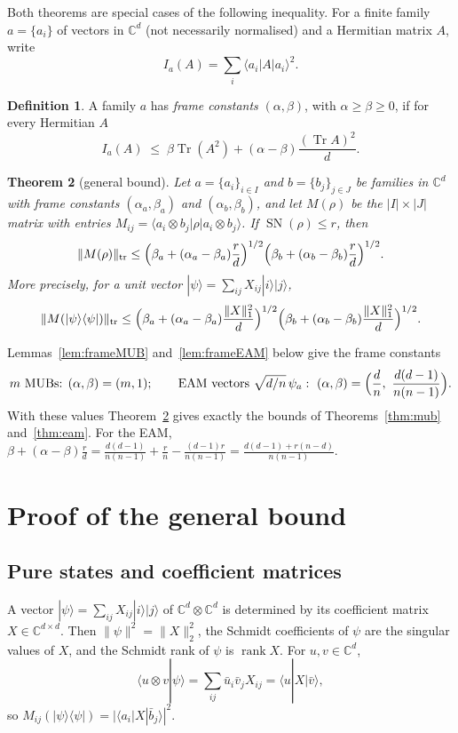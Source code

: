 \documentclass[11pt]{amsart}
\newtheorem{theorem}{Theorem}
\theoremstyle{definition}
\newtheorem{definition}[theorem]{Definition}
\theoremstyle{remark}
\newcommand{\C}{\mathbb{C}}
\newcommand{\Tr}{\operatorname{Tr}}
\newcommand{\SN}{\operatorname{SN}}
\newcommand{\tr}{\mathrm{tr}}
\newcommand{\ket}[1]{|#1\rangle}
\newcommand{\bra}[1]{\langle #1|}
\begin{document}
Both theorems are special cases of the following inequality. For a finite family $a=\{a_i\}$ of vectors in $\C^d$
(not necessarily normalised) and a Hermitian matrix $A$, write
\[
I_a(A)=\sum_i\bra{a_i}A\ket{a_i}^2 .
\]
\begin{definition}\label{def:frame}
A family $a$ has \emph{frame constants} $(\alpha,\beta)$, with $\alpha\ge\beta\ge0$, if for every Hermitian $A$
\begin{equation}\label{eq:frame}
I_a(A)\;\le\;\beta\Tr(A^2)+(\alpha-\beta)\frac{(\Tr A)^2}{d}.
\end{equation}
\end{definition}

\begin{theorem}[general bound]\label{thm:general}
Let $a=\{a_i\}_{i\in I}$ and $b=\{b_j\}_{j\in J}$ be families in $\C^d$ with frame constants $(\alpha_a,\beta_a)$
and $(\alpha_b,\beta_b)$, and let $M(\rho)$ be the $|I|\times|J|$ matrix with entries
$M_{ij}=\bra{a_i\otimes b_j}\rho\ket{a_i\otimes b_j}$. If $\SN(\rho)\le r$, then
\[
\|M(\rho)\|_{\tr}\le\Bigl(\beta_a+(\alpha_a-\beta_a)\frac rd\Bigr)^{1/2}\Bigl(\beta_b+(\alpha_b-\beta_b)\frac rd\Bigr)^{1/2}.
\]
More precisely, for a unit vector $\ket\psi=\sum_{ij}X_{ij}\ket i\ket j$,
\begin{equation}\label{eq:pure}
\|M(\ket\psi\bra\psi)\|_{\tr}\le\Bigl(\beta_a+(\alpha_a-\beta_a)\frac{\|X\|_1^2}{d}\Bigr)^{1/2}
\Bigl(\beta_b+(\alpha_b-\beta_b)\frac{\|X\|_1^2}{d}\Bigr)^{1/2}.
\end{equation}
\end{theorem}

Lemmas~\ref{lem:frameMUB} and~\ref{lem:frameEAM} below give the frame constants
\[
\text{$m$ MUBs: }(\alpha,\beta)=(m,1);\qquad
\text{EAM vectors }\sqrt{d/n}\,\psi_a:\ (\alpha,\beta)=\Bigl(\frac dn,\ \frac{d(d-1)}{n(n-1)}\Bigr).
\]
With these values Theorem~\ref{thm:general} gives exactly the bounds of Theorems~\ref{thm:mub}
and~\ref{thm:eam}. For the EAM,
$\beta+(\alpha-\beta)\frac rd=\frac{d(d-1)}{n(n-1)}+\frac rn-\frac{(d-1)r}{n(n-1)}=\frac{d(d-1)+r(n-d)}{n(n-1)}$.

\section{Proof of the general bound}\label{sec:proof}

\subsection{Pure states and coefficient matrices}
A vector $\ket\psi=\sum_{ij}X_{ij}\ket i\ket j$ of $\C^d\otimes\C^d$ is determined by its coefficient matrix
$X\in\C^{d\times d}$. Then $\|\psi\|^2=\|X\|_2^2$, the Schmidt coefficients of $\psi$ are the singular values of
$X$, and the Schmidt rank of $\psi$ is $\operatorname{rank}X$. For $u,v\in\C^d$,
\[
\langle u\otimes v|\psi\rangle=\sum_{ij}\bar u_i\bar v_jX_{ij}=\bra uX\ket{\bar v},
\]
so $M_{ij}(\ket\psi\bra\psi)=|\bra{a_i}X\ket{\bar b_j}|^2$.
\end{document}
